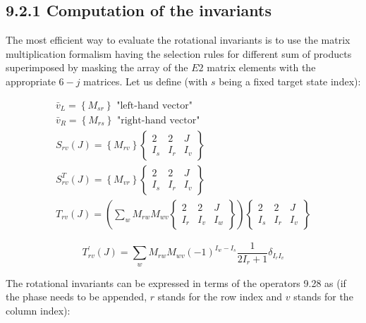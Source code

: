 \documentclass[10pt]{article}
\begin{document}
\subsection*{9.2.1 Computation of the invariants}
The most efficient way to evaluate the rotational invariants is to use the matrix multiplication formalism having the selection rules for different sum of products superimposed by masking the array of the $E 2$ matrix elements with the appropriate $6-j$ matrices. Let us define (with $s$ being a fixed target state index):


\begin{gather*}
\bar{v}_{L}=\left\{M_{s r}\right\} \text { "left-hand vector" }  \tag{9.28a}\\
\bar{v}_{R}=\left\{M_{r s}\right\} \text { "right-hand vector" }  \tag{9.28b}\\
S_{r v}(J)=\left\{M_{r v}\right\}\left\{\begin{array}{ccc}
2 & 2 & J \\
I_{s} & I_{r} & I_{v}
\end{array}\right\}  \tag{9.28c}\\
S_{r v}^{T}(J)=\left\{M_{v r}\right\}\left\{\begin{array}{ccc}
2 & 2 & J \\
I_{s} & I_{r} & I_{v}
\end{array}\right\}  \tag{9.28d}\\
T_{r v}(J)=\left(\sum_{w} M_{r w} M_{w v}\left\{\begin{array}{ccc}
2 & 2 & J \\
I_{r} & I_{v} & I_{w}
\end{array}\right\}\right)\left\{\begin{array}{ccc}
2 & 2 & J \\
I_{s} & I_{r} & I_{v}
\end{array}\right\} \tag{9.28e}
\end{gather*}



\begin{equation*}
T_{r v}^{\prime}(J)=\sum_{w} M_{r w} M_{w v}(-1)^{I_{w}-I_{s}} \frac{1}{2 I_{r}+1} \delta_{I_{r} I_{v}} \tag{9.28f}
\end{equation*}


The rotational invariants can be expressed in terms of the operators 9.28 as (if the phase needs to be appended, $r$ stands for the row index and $v$ stands for the column index):
\end{document}
